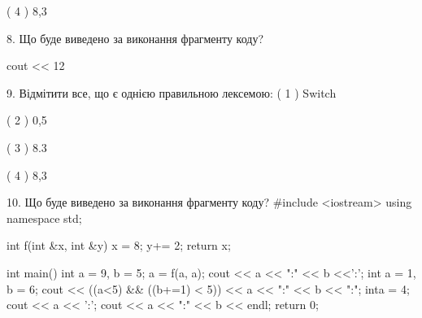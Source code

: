 \documentclass[11pt]{article}
\begin{document}
( 4 ) 8,3
\vspace{5mm}

8. Що буде виведено за виконання фрагменту коду?

cout << 12 %
\vspace{5mm}

9. %
Відмітити все, що є однією правильною лексемою:
( 1 ) Switch

( 2 ) 0,5

( 3 ) 8.3

( 4 ) 8,3
\vspace{5mm}

10. Що буде виведено за виконання фрагменту коду?
#include <iostream>
using namespace std;

int f(int &x, int &y){
    x = 8;
    y+= 2;
    return x;
}

int main(){
    int a = 9, b = 5;
    a = f(a, a);
    cout << a << ":" << b <<':';
    {
        int a = 1, b = 6;
        cout << ((a<5) && ((b+=1) < 5))
             << a << ":" << b << ":";
    }
    {
        inta = 4;
        cout << a << ':';
    }
    cout << a << ":" << b << endl;
    return 0;
}

\vspace{5mm}

\newpage
\end{document}
